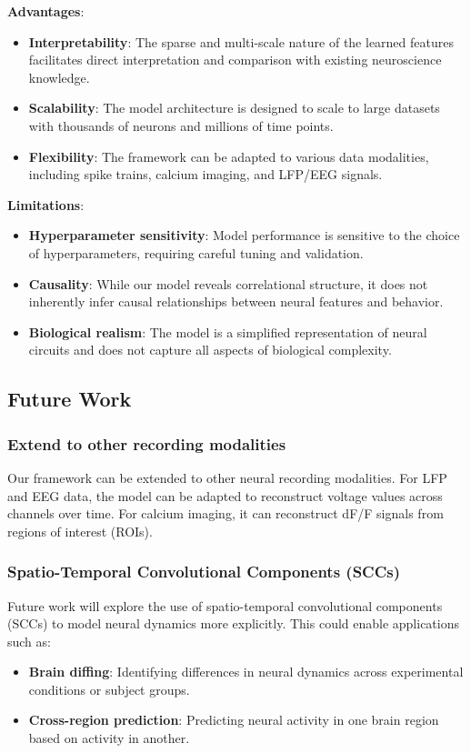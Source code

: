 \textbf{Advantages}:
\begin{itemize}
    \item \textbf{Interpretability}: The sparse and multi-scale nature of the learned features facilitates direct interpretation and comparison with existing neuroscience knowledge.
    \item \textbf{Scalability}: The model architecture is designed to scale to large datasets with thousands of neurons and millions of time points.
    \item \textbf{Flexibility}: The framework can be adapted to various data modalities, including spike trains, calcium imaging, and LFP/EEG signals.
\end{itemize}

\textbf{Limitations}:
\begin{itemize}
    \item \textbf{Hyperparameter sensitivity}: Model performance is sensitive to the choice of hyperparameters, requiring careful tuning and validation.
    \item \textbf{Causality}: While our model reveals correlational structure, it does not inherently infer causal relationships between neural features and behavior.
    \item \textbf{Biological realism}: The model is a simplified representation of neural circuits and does not capture all aspects of biological complexity.
\end{itemize}

\subsection{Future Work}

\subsubsection{Extend to other recording modalities}
Our framework can be extended to other neural recording modalities. For LFP and EEG data, the model can be adapted to reconstruct voltage values across channels over time. For calcium imaging, it can reconstruct dF/F signals from regions of interest (ROIs).

\subsubsection{Spatio-Temporal Convolutional Components (SCCs)}
Future work will explore the use of spatio-temporal convolutional components (SCCs) to model neural dynamics more explicitly. This could enable applications such as:
\begin{itemize}
    \item \textbf{Brain diffing}: Identifying differences in neural dynamics across experimental conditions or subject groups.
    \item \textbf{Cross-region prediction}: Predicting neural activity in one brain region based on activity in another.
\end{itemize}

